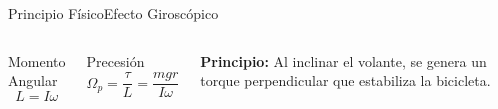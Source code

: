 \documentclass[10pt,xcolor={dvipsnames}]{beamer}
\begin{document}
\begin{frame}{Principio Físico}{Efecto Giroscópico}

\begin{columns}
\begin{block}{Momento Angular}
\begin{equation*}
L = I\omega
\end{equation*}
\end{block}

\begin{block}{Precesión}
\begin{equation*}
\Omega_p = \frac{\tau}{L} = \frac{mgr}{I\omega}
\end{equation*}
\end{block}

\textbf{Principio:} Al inclinar el volante, se genera un torque perpendicular que estabiliza la bicicleta.

\begin{center}

\vspace{0.3cm}

\end{center}
\end{columns}
\end{frame}
\end{document}
